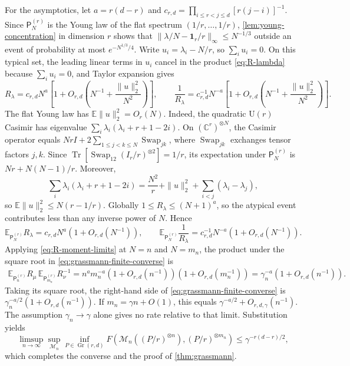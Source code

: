 \documentclass[11pt]{article}
\theoremstyle{remark}
\theoremstyle{plain}
\newcommand{\C}{\mathbb C}
\newcommand{\cM}{\mathcal M}
\newcommand{\U}{\mathrm U}
\newcommand{\Gr}{\operatorname{Gr}}
\newcommand{\Tr}{\operatorname{Tr}}
\newcommand{\ot}{\otimes}
\begin{document}
For the asymptotics, let \(a=r(d-r)\) and
\(c_{r,d}=\prod_{i\le r<j\le d}[r(j-i)]^{-1}\).  Since
\(\mathsf P_N^{(r)}\) is the Young law of the flat spectrum
\((1/r,\ldots,1/r)\), \cref{lem:young-concentration} in dimension \(r\)
shows that \(\|\lambda/N-\mathbf1_r/r\|_\infty\le N^{-1/3}\) outside an
event of probability at most \(e^{-N^{1/3}/4}\).  Write
\(u_i=\lambda_i-N/r\), so \(\sum_i u_i=0\).  On this typical set,
the leading linear terms in \(u_i\) cancel in the product
\eqref{eq:R-lambda} because \(\sum_i u_i=0\), and Taylor expansion gives
\[
  R_\lambda=c_{r,d}N^a
    \left[1+O_{r,d}\!\left(N^{-1}+\frac{\|u\|_2^2}{N^2}\right)\right],
  \qquad
  \frac1{R_\lambda}=c_{r,d}^{-1}N^{-a}
    \left[1+O_{r,d}\!\left(N^{-1}+\frac{\|u\|_2^2}{N^2}\right)\right].
\]
The flat Young law has \(\mathbb E\|u\|_2^2=O_r(N)\).  Indeed, the
quadratic \(\U(r)\) Casimir has eigenvalue
\(\sum_i\lambda_i(\lambda_i+r+1-2i)\).  On \((\C^r)^{\ot N}\), the
Casimir operator equals
\(NrI+2\sum_{1\le j<k\le N}\operatorname{Swap}_{jk}\), where
\(\operatorname{Swap}_{jk}\) exchanges tensor factors \(j,k\).  Since
\(\Tr[\operatorname{Swap}_{12}(I_r/r)^{\ot 2}]=1/r\), its expectation under
\(\mathsf P_N^{(r)}\) is \(Nr+N(N-1)/r\).  Moreover,
\[
  \sum_i\lambda_i(\lambda_i+r+1-2i)
  =\frac{N^2}{r}+\|u\|_2^2
   +\sum_{i<j}(\lambda_i-\lambda_j),
\]
so \(\mathbb E\|u\|_2^2\le N(r-1/r)\).  Globally
\(1\le R_\lambda\le(N+1)^a\), so the atypical
event contributes less than any inverse power of \(N\).  Hence
\begin{equation}\label{eq:R-moment-limits}
  \mathbb E_{\mathsf P_N^{(r)}}R_\lambda
  =c_{r,d}N^a(1+O_{r,d}(N^{-1})),
  \qquad
  \mathbb E_{\mathsf P_N^{(r)}}\frac1{R_\lambda}
  =c_{r,d}^{-1}N^{-a}(1+O_{r,d}(N^{-1})).
\end{equation}
Applying \eqref{eq:R-moment-limits} at \(N=n\) and \(N=m_n\), the product
under the square root in \eqref{eq:grassmann-finite-converse} is
\[
\begin{aligned}
\mathbb E_{\mathsf P_n^{(r)}}R_\mu\,
\mathbb E_{\mathsf P_{m_n}^{(r)}}R_\nu^{-1}
=n^a m_n^{-a}
  (1+O_{r,d}(n^{-1}))(1+O_{r,d}(m_n^{-1}))
=\gamma_n^{-a}(1+O_{r,d}(n^{-1})).
\end{aligned}
\]
Taking its square root, the right-hand side of
\eqref{eq:grassmann-finite-converse} is
\(\gamma_n^{-a/2}(1+O_{r,d}(n^{-1}))\).  If
\(m_n=\gamma n+O(1)\), this equals
\(\gamma^{-a/2}+O_{r,d,\gamma}(n^{-1})\). The assumption
\(\gamma_n\to\gamma\) alone gives no rate relative to that limit.
Substitution yields
\begin{equation}\label{eq:grassmann-converse-limit}
  \limsup_{n\to\infty}\sup_{\cM_n}\inf_{P\in\Gr(r,d)}
  F\!\left(\cM_n((P/r)^{\ot n}),(P/r)^{\ot m_n}\right)
  \le\gamma^{-r(d-r)/2},
\end{equation}
which completes the converse and the proof of \cref{thm:grassmann}.
\end{document}
